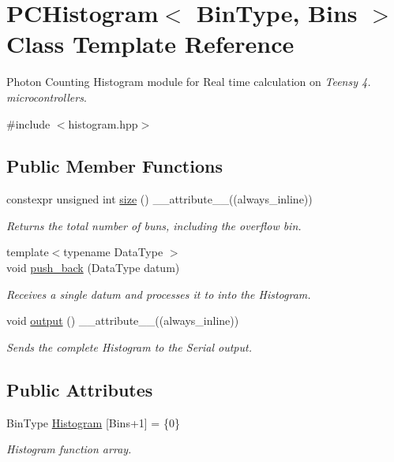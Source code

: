\hypertarget{classPCHistogram}{}\section{P\+C\+Histogram$<$ Bin\+Type, Bins $>$ Class Template Reference}
\label{classPCHistogram}


Photon Counting Histogram module for Real time calculation on {\itshape Teensy 4. microcontrollers}.  




{\ttfamily \#include $<$histogram.\+hpp$>$}

\subsection*{Public Member Functions}
\begin{DoxyCompactItemize}
\item 
constexpr unsigned int \hyperlink{classPCHistogram_a4c7558c7cebdd928c0b6e0c548baf1b9}{size} () \+\_\+\+\_\+attribute\+\_\+\+\_\+((always\+\_\+inline))
\begin{DoxyCompactList}\small\item\em Returns the total number of buns, including the overflow bin. \end{DoxyCompactList}\item 
{\footnotesize template$<$typename Data\+Type $>$ }\\void \hyperlink{classPCHistogram_a0885e66d0de46bd16b72b870d7f410fc}{push\+\_\+back} (Data\+Type datum)
\begin{DoxyCompactList}\small\item\em Receives a single datum and processes it to into the Histogram. \end{DoxyCompactList}\item 
void \hyperlink{classPCHistogram_af4391ac8ad3f4d9865ee6335fb563b4c}{output} () \+\_\+\+\_\+attribute\+\_\+\+\_\+((always\+\_\+inline))
\begin{DoxyCompactList}\small\item\em Sends the complete Histogram to the Serial output. \end{DoxyCompactList}\end{DoxyCompactItemize}
\subsection*{Public Attributes}
\begin{DoxyCompactItemize}
\item 
Bin\+Type \hyperlink{classPCHistogram_a239c7b1e34b2ecc1808e2304d71bc1e2}{Histogram} \mbox{[}Bins+1\mbox{]} = \{0\}
\begin{DoxyCompactList}\small\item\em Histogram function array. \end{DoxyCompactList}\end{DoxyCompactItemize}
